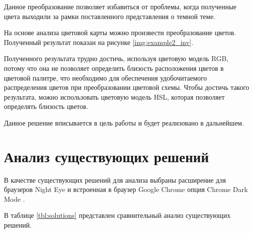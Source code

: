 Данное преобразование позволяет избавиться от проблемы, когда полученные цвета выходили за рамки поставленного представления о темной теме.

\clearpage

На основе анализа цветовой карты можно произвести преобразование цветов. Полученный результат показан на рисунке \ref{img:example2_inv}.


Полученного результата трудно достичь, используя цветовую модель RGB, потому что она не позволяет определить близость расположения цветов в цветовой палитре, что необходимо для обеспечения удобочитаемого распределения цветов при преобразовании цветовой схемы. Чтобы достичь такого результата, можно использовать цветовую модель HSL, которая позволяет определять близость цветов.

Данное решение вписывается в цель работы и будет реализовано в дальнейшем.

\section{Анализ существующих решений}

В качестве существующих решений для анализа выбраны расширение для браузеров Night Eye \cite{nighteye} и встроенная в браузер Google Chrome \cite{chrome} опция Chrome Dark Mode \cite{chromedarkmode}.

В таблице \ref{tbl:solutions} представлен сравнительный анализ существующих решений.

\begin{table}[H]
	\caption{Анализ существующих решений}
	\centering
\end{table}

